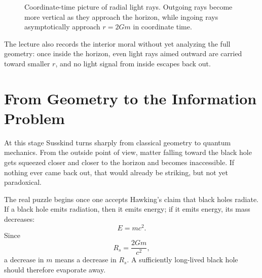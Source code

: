 \begin{figure}[h]
\centering
{}
\caption{Coordinate-time picture of radial light rays. Outgoing rays become more vertical as they approach the horizon, while ingoing rays asymptotically approach \(r=2Gm\) in coordinate time.}
\end{figure}

The lecture also records the interior moral without yet analyzing the full geometry: once inside the horizon, even light rays aimed outward are carried toward smaller \(r\), and no light signal from inside escapes back out.

\section{From Geometry to the Information Problem}

At this stage Susskind turns sharply from classical geometry to quantum mechanics. From the outside point of view, matter falling toward the black hole gets squeezed closer and closer to the horizon and becomes inaccessible. If nothing ever came back out, that would already be striking, but not yet paradoxical.

The real puzzle begins once one accepts Hawking's claim that black holes radiate. If a black hole emits radiation, then it emits energy; if it emits energy, its mass decreases:
\begin{equation}
E=mc^2.
\end{equation}
Since
\begin{equation}
R_s=\frac{2Gm}{c^2},
\end{equation}
a decrease in \(m\) means a decrease in \(R_s\). A sufficiently long-lived black hole should therefore evaporate away.

